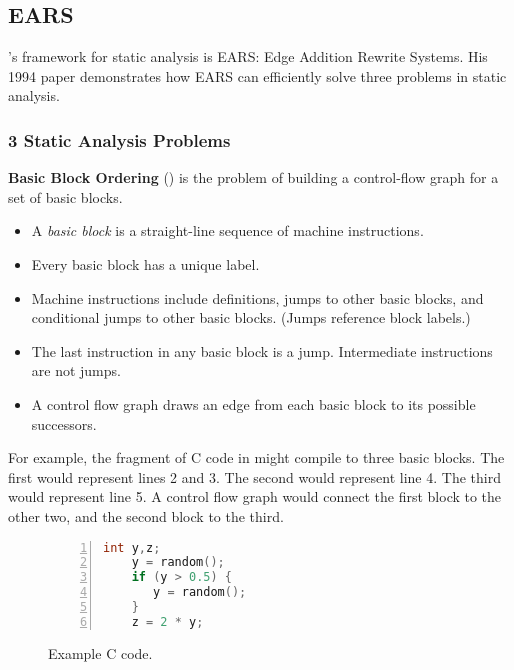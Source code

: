 \documentclass{article}
\begin{document}
\subsection*{EARS}

\assmann{}'s framework for static analysis is EARS: Edge Addition Rewrite Systems.
His 1994 paper demonstrates how EARS can efficiently solve three problems in static analysis.


\subsubsection*{3 Static Analysis Problems}

\textbf{Basic Block Ordering} ({\bb}) is the problem of building a control-flow graph for a set of basic blocks.
\begin{itemize}
\item A \emph{basic block} is a straight-line sequence of machine instructions.
\item Every basic block has a unique label.
\item Machine instructions include definitions, jumps to other basic blocks, and conditional jumps to other basic blocks. (Jumps reference block labels.)
\item The last instruction in any basic block is a jump. Intermediate instructions are not jumps.
\item A control flow graph draws an edge from each basic block to its possible successors.
\end{itemize}

For example, the fragment of C code in  might compile to three basic blocks.
The first would represent lines 2 and 3.
The second would represent line 4.
The third would represent line 5.
A control flow graph would connect the first block to the other two, and the second block to the third.

\begin{figure}[t]
  \begin{lstlisting}[language=C,numbers=left,basicstyle=\tt,xleftmargin=.2\textwidth]
    int y,z;
    y = random();
    if (y > 0.5) {
       y = random();
    }
    z = 2 * y;
  \end{lstlisting}
\caption{Example C code.}
\label{fig:ears-c}
\end{figure}

\vspace{2ex}
\end{document}
